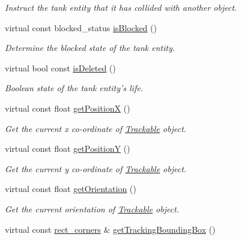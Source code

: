 \begin{DoxyCompactItemize}
\begin{DoxyCompactList}\small\item\em Instruct the tank entity that it has collided with another object. \end{DoxyCompactList}\item 
\hypertarget{class_tank_a6ca225d5f7a4c3b835da4a157b86c692}{virtual const blocked\+\_\+status \hyperlink{class_tank_a6ca225d5f7a4c3b835da4a157b86c692}{is\+Blocked} ()}\label{class_tank_a6ca225d5f7a4c3b835da4a157b86c692}

\begin{DoxyCompactList}\small\item\em Determine the blocked state of the tank entity. \end{DoxyCompactList}\item 
\hypertarget{class_tank_a33a62b283cdaf362415fad768d2f6df3}{virtual bool const \hyperlink{class_tank_a33a62b283cdaf362415fad768d2f6df3}{is\+Deleted} ()}\label{class_tank_a33a62b283cdaf362415fad768d2f6df3}

\begin{DoxyCompactList}\small\item\em Boolean state of the tank entity's life. \end{DoxyCompactList}\item 
virtual const float \hyperlink{class_tank_ab1e8f987cf6702d0a5f902fcdce2dc38}{get\+Position\+X} ()
\begin{DoxyCompactList}\small\item\em Get the current x co-\/ordinate of \hyperlink{class_trackable}{Trackable} object. \end{DoxyCompactList}\item 
virtual const float \hyperlink{class_tank_ac78e2f8ecc69da315f68f4244f452bde}{get\+Position\+Y} ()
\begin{DoxyCompactList}\small\item\em Get the current y co-\/ordinate of \hyperlink{class_trackable}{Trackable} object. \end{DoxyCompactList}\item 
\hypertarget{class_tank_a893bb5e1f3ac38bd2960d1f629505ea0}{virtual const float \hyperlink{class_tank_a893bb5e1f3ac38bd2960d1f629505ea0}{get\+Orientation} ()}\label{class_tank_a893bb5e1f3ac38bd2960d1f629505ea0}

\begin{DoxyCompactList}\small\item\em Get the current orientation of \hyperlink{class_trackable}{Trackable} object. \end{DoxyCompactList}\item 
\hypertarget{class_tank_ac3bc1fb6dc7e36c781b6cf8a29ae87eb}{virtual const \hyperlink{structrect__corners}{rect\+\_\+corners} \& \hyperlink{class_tank_ac3bc1fb6dc7e36c781b6cf8a29ae87eb}{get\+Tracking\+Bounding\+Box} ()}\label{class_tank_ac3bc1fb6dc7e36c781b6cf8a29ae87eb}


\end{DoxyCompactItemize}
